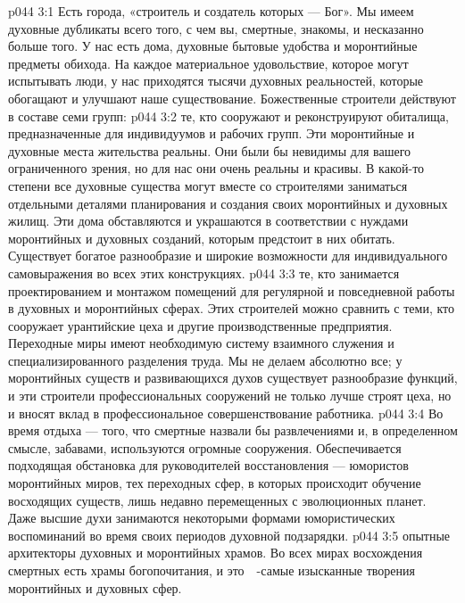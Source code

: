 \vs p044 3:1 Есть города, «строитель и создатель которых --- Бог». Мы имеем духовные дубликаты всего того, с чем вы, смертные, знакомы, и несказанно больше того. У нас есть дома, духовные бытовые удобства и моронтийные предметы обихода. На каждое материальное удовольствие, которое могут испытывать люди, у нас приходятся тысячи духовных реальностей, которые обогащают и улучшают наше существование. Божественные строители действуют в составе семи групп:
\vs p044 3:2 \pc {}\bibnobreakspace {} те, кто сооружают и реконструируют обиталища, предназначенные для индивидуумов и рабочих групп. Эти моронтийные и духовные места жительства реальны. Они были бы невидимы для вашего ограниченного зрения, но для нас они очень реальны и красивы. В какой\hyp{}то степени все духовные существа могут вместе со строителями заниматься отдельными деталями планирования и создания своих моронтийных и духовных жилищ. Эти дома обставляются и украшаются в соответствии с нуждами моронтийных и духовных созданий, которым предстоит в них обитать. Существует богатое разнообразие и широкие возможности для индивидуального самовыражения во всех этих конструкциях.
\vs p044 3:3 \pc {}\bibnobreakspace {} те, кто занимается проектированием и монтажом помещений для регулярной и повседневной работы в духовных и моронтийных сферах. Этих строителей можно сравнить с теми, кто сооружает урантийские цеха и другие производственные предприятия. Переходные миры имеют необходимую систему взаимного служения и специализированного разделения труда. Мы не делаем абсолютно все; у моронтийных существ и развивающихся духов существует разнообразие функций, и эти строители профессиональных сооружений не только лучше строят цеха, но и вносят вклад в профессиональное совершенствование работника.
\vs p044 3:4 \pc {}\bibnobreakspace {} Во время отдыха --- того, что смертные назвали бы развлечениями и, в определенном смысле, забавами, используются огромные сооружения. Обеспечивается подходящая обстановка для руководителей восстановления --- юмористов моронтийных миров, тех переходных сфер, в которых происходит обучение восходящих существ, лишь недавно перемещенных с эволюционных планет. Даже высшие духи занимаются некоторыми формами юмористических воспоминаний во время своих периодов духовной подзарядки.
\vs p044 3:5 \pc {}\bibnobreakspace {} опытные архитекторы духовных и моронтийных храмов. Во всех мирах восхождения смертных есть храмы богопочитания, и это　\hyp{}самые изысканные творения моронтийных и духовных сфер.

